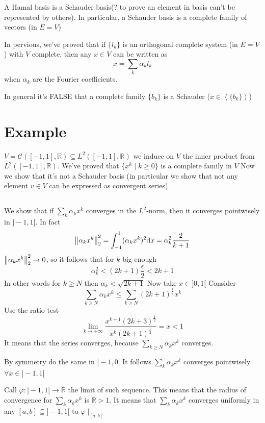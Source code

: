 \documentclass{book}
\newcommand{\leftbracket}{[}
\newcommand{\rightbracket}{]}
\begin{document}
A Hamal basis is a Schauder basis(? to prove an element in basis can't be represented by others). In particular, a Schauder basis is a complete family of vectors (in $E=V$)

In pervious, we've proved that if $\{l_k\}$ is an orthogonal complete system (in $E=V$) with $V$ complete, then any $x\in V$ can be written as$$x=\sum\limits_k\alpha_kl_k$$ when $\alpha_k$ are the Fourier coefficients.

In general it's FALSE that a complete family $\{b_k\}$ is a Schauder ($x\in \overline{\left<\{b_k\}\right>}$)
\section*{Example}
$V=\mathcal{C}([-1,1],\mathbb{R})\subseteq L^2([-1,1],\mathbb{R})$
we induce on $V$ the inner product from $L^2([-1,1],\mathbb{R})$. We've proved that $\{x^k\mid k\geq0\}$ is a complete family in $V$ Now we show that it's not a Schauder basis (in particular we show that not any element $v\in V$ can be expressed as convergent series)
\subsection{}
We show that if $\sum\limits_k\alpha_kx^k$ converges in the $L^2$-norm, then it converges pointwisely in $\rightbracket-1,1\leftbracket$. In fact $$\left\lVert \alpha_kx^k \right\rVert_2^2=\int_{-1}^1(\alpha_kx^k)^2\text{d}x=\alpha_k^2\frac{2}{k+1}$$
$\left\lVert \alpha_kx^k \right\rVert_2^2\rightarrow 0$, so it follows that for $k$ big enough $$\alpha_k^2<(2k+1)\frac{\epsilon}2<2k+1$$
In other words for $k\geq N$ then $\alpha_k<\sqrt{2k+1}$
Now take $x\in \rightbracket 0,1\leftbracket$ Consider $$\sum\limits_{k\geq N}\alpha_kx^k\leq\sum\limits_{k\geq N}(2k+1)^{\frac{1}{2}}x^k$$
Use the ratio test$$\lim\limits_{k\rightarrow+\infty}\frac{x^{k+1}(2k+3)^{\frac{1}{2}}}{x^k(2k+1)^{\frac{1}{2}}}=x<1$$ It means that the series converges, because $\sum\limits_{k\geq N}\alpha_kx^k$ converges.

By symmetry do the same in $\rightbracket-1,0\rightbracket$ It follows $\sum\limits_k\alpha_kx^k$ converges pointwisely $\forall x\in \rightbracket-1,1\leftbracket$

Call $\varphi:\rightbracket-1,1\leftbracket\rightarrow \mathbb{R}$ the limit of such sequence. This means that the radius of convergence for $\sum\limits_k\alpha_kx^k$ is $\mathbb{R}>1$. It means that $\sum\limits_k\alpha_kx^k$  converges uniformly in any $[a,b]\subseteq\rightbracket-1,1\leftbracket$ to $\varphi\mid_{[a,b]}$
\end{document}
